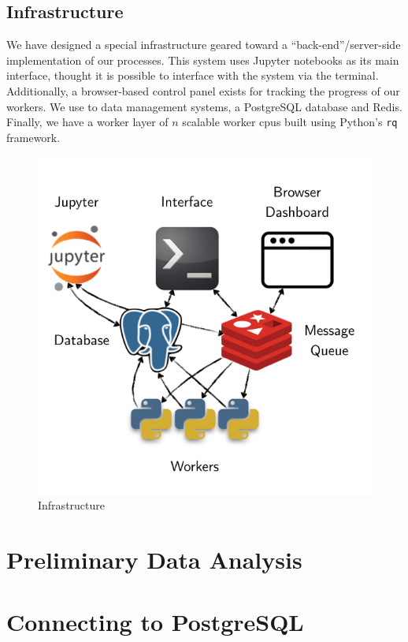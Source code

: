 \documentclass[]{report}
\begin{document}
\section{Infrastructure}\label{infrastructure}

We have designed a special infrastructure geared toward a
``back-end''/server-side implementation of our processes. This system
uses Jupyter notebooks as its main interface, thought it is possible to
interface with the system via the terminal. Additionally, a
browser-based control panel exists for tracking the progress of our
workers. We use to data management systems, a PostgreSQL database and
Redis. Finally, we have a worker layer of \(n\) scalable worker cpus
built using Python's \texttt{rq} framework.

\begin{figure}[htbp]
\centering
\includegraphics{assets/img/infrastructure.png}
\caption{Infrastructure}
\end{figure}

\chapter{Preliminary Data Analysis}

\chapter{Connecting to PostgreSQL}\label{connecting-to-postgresql}
\end{document}
